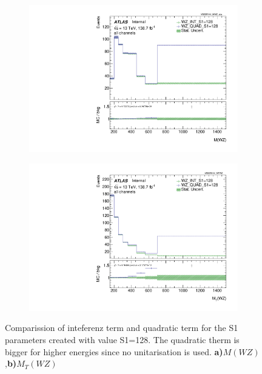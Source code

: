 \documentclass[../Bachelorarbeit.tex]{subfiles}
\begin{document}
\begin{figure}[h]
    \centering
    \begin{subfigure}{0.4\textwidth}
        \centering
        \includegraphics[width=\textwidth]{Plots/int_quad_comparision/all_VV_MWZ_vbs.pdf}
        \caption{}
    \end{subfigure}
    \begin{subfigure}{0.4\textwidth}
        \centering
        \includegraphics[width=\textwidth]{Plots/int_quad_comparision/all_VV_MTWZ.pdf}
        \caption{}
    \end{subfigure}
    \caption{Comparission of inteferenz term and quadratic term for the S1 parameters created with value S1=128. The quadratic therm is bigger for higher energies since no unitarisation is used. \textbf{a)}$M(WZ)$,\textbf{b)}$M_{T}(WZ)$}
    \label{fig:dim8_quad_int_comparission}
\end{figure}
\end{document}
